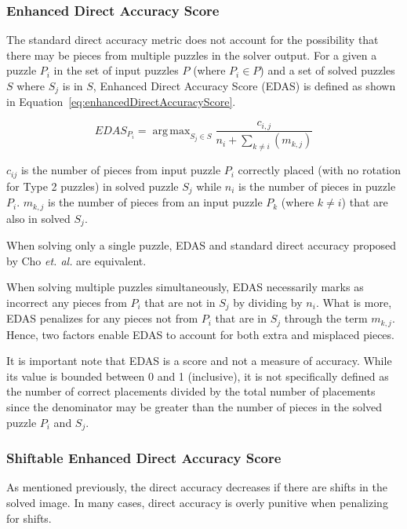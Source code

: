 \documentclass{report}
\DeclareMathOperator*{\argmax}{arg\,max} %
\begin{document}
\subsubsection{Enhanced Direct Accuracy Score}\label{sec:enhancedDirectAccuracyScore}

The standard direct accuracy metric does not account for the possibility that there may be pieces from multiple puzzles in the solver output.  For a given a puzzle $P_i$ in the set of input puzzles $P$ (where $P_i \in P$) and a set of solved puzzles $S$ where $S_j$ is in $S$, Enhanced Direct Accuracy Score (EDAS) is defined as shown in Equation~\ref{eq:enhancedDirectAccuracyScore}.

\begin{equation} \label{eq:enhancedDirectAccuracyScore}
EDAS_{P_i} = \argmax_{S_j \in S}\frac{c_{i,j}}{n_i + \sum_{k \ne i}(m_{k,j})}
\end{equation}

\noindent
$c_{ij}$ is the number of pieces from input puzzle $P_i$ correctly placed (with no rotation for Type 2 puzzles) in solved puzzle $S_j$ while $n_i$ is the number of pieces in puzzle $P_i$. $m_{k,j}$ is the number of pieces from an input puzzle $P_k$ (where $k \ne i$) that are also in solved $S_j$.

When solving only a single puzzle, EDAS and standard direct accuracy proposed by Cho \textit{et. al.} are equivalent.  

When solving multiple puzzles simultaneously, EDAS necessarily marks as incorrect any pieces from $P_i$ that are not in $S_j$ by dividing by $n_i$.  What is more, EDAS penalizes for any pieces not from $P_i$ that are in $S_j$ through the term $m_{k,j}$.  Hence, two factors enable EDAS to account for both extra and misplaced pieces.

It is important note that EDAS is a score and not a measure of accuracy. While its value is bounded between 0 and 1 (inclusive), it is not specifically defined as the number of correct placements divided by the total number of placements since the denominator may be greater than the number of pieces in the solved puzzle $P_i$ and $S_j$.

\subsubsection{Shiftable Enhanced Direct Accuracy Score}\label{sec:shiftableEnhancedDirectAccuracy}

As mentioned previously, the direct accuracy decreases if there are shifts in the solved image.  In many cases, direct accuracy is overly punitive when penalizing for shifts. 
\end{document}
